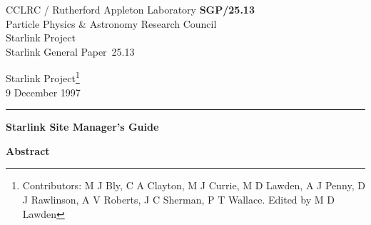 \documentclass[twoside,11pt]{article}
\newcommand{\stardoccategory}  {Starlink General Paper}
\newcommand{\stardocinitials}  {SGP}
\newcommand{\stardocnumber}    {25.13}
\newcommand{\stardocauthors}   {Starlink Project\footnote[1]{Contributors:
 M J Bly, C A Clayton, M J Currie, M D Lawden, A J Penny, D J Rawlinson,
 A V Roberts, J C Sherman, P T Wallace.
 Edited by M D Lawden}}
\newcommand{\stardocdate}      {9 December 1997}
\newcommand{\stardoctitle}     {Starlink Site Manager's Guide}
\newcommand{\stardocname}{\stardocinitials /\stardocnumber}
\newenvironment{latexonly}{}{}
\begin{document}
\thispagestyle{empty}

\begin{latexonly}
   CCLRC / {\sc Rutherford Appleton Laboratory} \hfill {\bf \stardocname}\\
   {\large Particle Physics \& Astronomy Research Council}\\
   {\large Starlink Project\\}
   {\large \stardoccategory\ \stardocnumber}
   \begin{flushright}
   \stardocauthors\\
   \stardocdate
   \end{flushright}
   \vspace{-4mm}
   \rule{\textwidth}{0.5mm}
   \vspace{5mm}
   \begin{center}
   {\Huge\bf \stardoctitle}
   \end{center}
   \vspace{5mm}

   \vspace{10mm}
   \begin{center}
      {\Large\bf Abstract}
   \end{center}
\end{latexonly}
\end{document}
